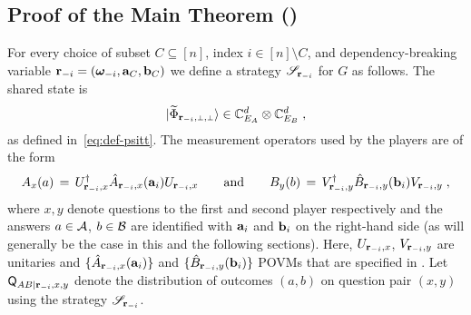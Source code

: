 \subsection{Proof of the Main Theorem ()}


For every choice of subset $C \subseteq [n]$, index  $i \in [n] \setminus C$, and dependency-breaking variable $\mathbf{r}_{-i} = ({\boldsymbol{\omega}}_{-i},\mathbf{a}_C,\mathbf{b}_C)$ we define a  strategy $\mathscr{S}_{\mathbf{r}_{-i}}$ for $G$ as follows. The shared state is 
\[\ket{\wt{\Phi}_\sspp} \in \C_{E_A}^d \otimes \C_{E_B}^d\;,\]
as defined in~\eqref{eq:def-psitt}. The measurement operators used by the players are of the form 
\[ A_x(a)\,=\,  U_{\mathbf{r}_{-i},x}^\dagger \hat{A}_{\mathbf{r}_{-i},x}(\mathbf{a}_i)U_{\mathbf{r}_{-i},x}\qquad\text{and}\qquad B_y(b) \,=\,V_{\mathbf{r}_{-i},y}^\dagger\hat{B}_{\mathbf{r}_{-i}, y}(\mathbf{b}_i) V_{\mathbf{r}_{-i},y}\;,\]
where $x,y$ denote questions to the first and second player respectively and the answers $a\in \mathcal{A}$, $b\in \mathcal{B}$ are identified with $\mathbf{a}_i$ and $\mathbf{b}_i$ on the right-hand side (as will generally be the case in this and the following sections). 
Here, $U_{\mathbf{r}_{-i},x}$, $V_{\mathbf{r}_{-i},y}$ are unitaries and $\{\hat{A}_{\mathbf{r}_{-i},x}(\mathbf{a}_i) \}$ and $\{\hat{B}_{\mathbf{r}_{-i}, y}(\mathbf{b}_i)\}$ POVMs that are specified in .
Let $\mathsf{Q}_{A B | \mathbf{r}_{-i}, x,y}$ denote the distribution of outcomes $(a,b)$ on question pair $(x,y)$ using the strategy $\mathscr{S}_{\mathbf{r}_{-i}}$. %

